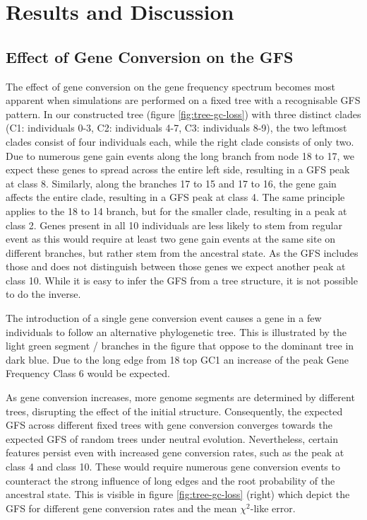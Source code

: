 \chapter{Results and Discussion}\label{kap:results}
\section{Effect of Gene Conversion on the GFS}
The effect of gene conversion on the gene frequency spectrum becomes most apparent when simulations are performed on a fixed tree with a recognisable \ac{GFS} pattern.
In our constructed tree (figure \ref{fig:tree-gc-loss}) with three distinct clades (C1: individuals 0-3, C2: individuals 4-7, C3: individuals 8-9),
the two leftmost clades consist of four individuals each, while the right clade consists of only two.
Due to numerous gene gain events along the long branch from node 18 to 17, we expect these genes to spread across the entire left side, resulting in a \ac{GFS} peak at class 8.
Similarly, along the branches 17 to 15 and 17 to 16, the gene gain affects the entire clade, resulting in a \ac{GFS} peak at class 4.
The same principle applies to the 18 to 14 branch, but for the smaller clade, resulting in a peak at class 2.
Genes present in all 10 individuals are less likely to stem from regular event as this would require at least two gene gain events at the same site on different branches, but rather stem from the ancestral state.
As the \ac{GFS} includes those and does not distinguish between those genes we expect another peak at class 10.
While it is easy to infer the GFS from a tree structure, it is not possible to do the inverse.


The introduction of a single gene conversion event causes a gene in a few individuals to follow an alternative phylogenetic tree.
This is illustrated by the light green segment / branches in the figure that oppose to the dominant tree in dark blue.
Due to the long edge from 18 top GC1 an increase of the peak Gene Frequency Class 6 would be expected.


As gene conversion increases, more genome segments are determined by different trees, disrupting the effect of the initial structure.
Consequently, the expected \ac{GFS} across different fixed trees with gene conversion converges towards the expected \ac{GFS} of random trees under neutral evolution.
Nevertheless, certain features persist even with increased gene conversion rates, such as the peak at class 4 and class 10.
These would require numerous gene conversion events to counteract the strong influence of long edges and the root probability of the ancestral state.
This is visible in figure \ref{fig:tree-gc-loss} (right) which depict the \ac{GFS} for different gene conversion rates and the mean $\chi^2$-like error.

